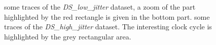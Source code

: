 \begin{figure}
\centering
{}
\caption[Hardware misalignment: \emph{DS\_low\_jitter} and \emph{DS\_high\_jitter} datasets.]{  some traces of the \emph{DS\_low\_jitter} dataset, a zoom of the part highlighted by the red rectangle is given in the bottom part.  some traces of the \emph{DS\_high\_jitter} dataset. The interesting clock cycle is highlighted by the grey rectangular area.}\label{fig:jitter_traces}
\end{figure}


%
%


